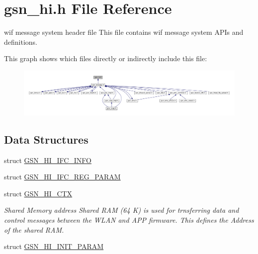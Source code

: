 \hypertarget{a00504}{
\section{gsn\_\-hi.h File Reference}
\label{a00504}
}


wif message system header file This file contains wif message system APIs and definitions.  


This graph shows which files directly or indirectly include this file:
\nopagebreak
\begin{figure}[H]
\begin{center}
\leavevmode
\includegraphics[width=400pt]{a00735}
\end{center}
\end{figure}
\subsection*{Data Structures}
\begin{DoxyCompactItemize}
\item 
struct \hyperlink{a00086}{GSN\_\-HI\_\-IFC\_\-INFO}
\item 
struct \hyperlink{a00087}{GSN\_\-HI\_\-IFC\_\-REG\_\-PARAM}
\item 
struct \hyperlink{a00085}{GSN\_\-HI\_\-CTX}
\begin{DoxyCompactList}\small\item\em Shared Memory address Shared RAM (64 K) is used for trnsferring data and control messages between the WLAN and APP firmware. This defines the Address of the shared RAM. \end{DoxyCompactList}\item 
struct \hyperlink{a00088}{GSN\_\-HI\_\-INIT\_\-PARAM}
\end{DoxyCompactItemize}
